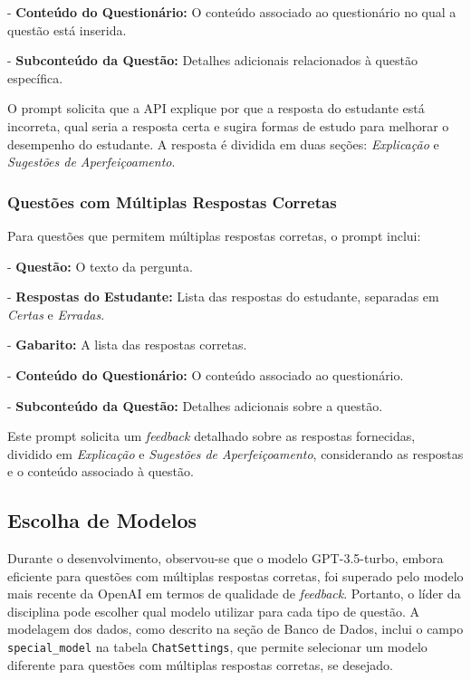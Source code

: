 - \textbf{Conteúdo do Questionário:} O conteúdo associado ao questionário no qual a questão está inserida.

- \textbf{Subconteúdo da Questão:} Detalhes adicionais relacionados à questão específica.

O prompt solicita que a API explique por que a resposta do estudante está incorreta, qual seria a resposta certa e sugira formas de estudo para melhorar o desempenho do estudante. A resposta é dividida em duas seções: \textit{Explicação} e \textit{Sugestões de Aperfeiçoamento}.

\subsubsection{Questões com Múltiplas Respostas Corretas}

Para questões que permitem múltiplas respostas corretas, o prompt inclui:

- \textbf{Questão:} O texto da pergunta.

- \textbf{Respostas do Estudante:} Lista das respostas do estudante, separadas em \textit{Certas} e \textit{Erradas}.

- \textbf{Gabarito:} A lista das respostas corretas.

- \textbf{Conteúdo do Questionário:} O conteúdo associado ao questionário.

- \textbf{Subconteúdo da Questão:} Detalhes adicionais sobre a questão.

Este prompt solicita um \textit{feedback} detalhado sobre as respostas fornecidas, dividido em \textit{Explicação} e \textit{Sugestões de Aperfeiçoamento}, considerando as respostas e o conteúdo associado à questão.

\subsection{Escolha de Modelos}

Durante o desenvolvimento, observou-se que o modelo GPT-3.5-turbo, embora eficiente para questões com múltiplas respostas corretas, foi superado pelo modelo mais recente da OpenAI em termos de qualidade de \textit{feedback}. Portanto, o líder da disciplina pode escolher qual modelo utilizar para cada tipo de questão. A modelagem dos dados, como descrito na seção de Banco de Dados, inclui o campo \texttt{special\_model} na tabela \texttt{ChatSettings}, que permite selecionar um modelo diferente para questões com múltiplas respostas corretas, se desejado.

